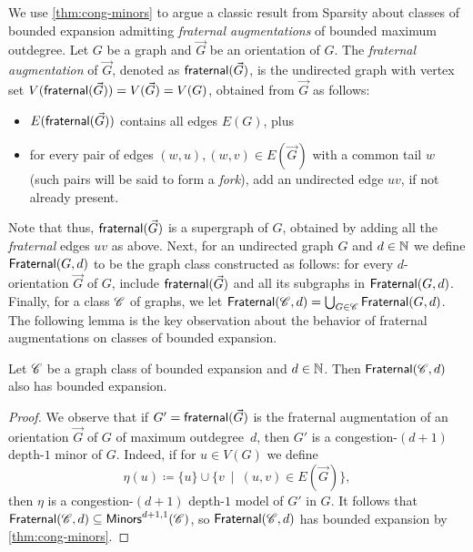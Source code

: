 We use \cref{thm:cong-minors} to argue a classic result from Sparsity %
about classes of bounded expansion admitting \emph{fraternal augmentations} of bounded maximum outdegree. Let $G$ be a graph and $\vec G$ be an orientation of $G$. The \emph{fraternal augmentation} of $\vec G$, denoted as $\mathsf{fraternal}(\vec G)$, is the undirected graph with vertex set $V(\mathsf{fraternal}(\vec G))=V(\vec G)=V(G)$, obtained from $\vec G$ as follows:
\begin{itemize}
    \item $E(\mathsf{fraternal}(\vec G))$ contains all edges $E(G)$, plus
	\item for every pair of edges $(w, u),(w, v)\in E(\vec G)$ with a common tail $w$ (such pairs will be said to form a \emph{fork}), add an undirected edge $uv$, if not already present.%
\end{itemize}
Note that thus, $\mathsf{fraternal}(\vec G)$ is a supergraph of $G$, obtained by adding all the \emph{fraternal} edges $uv$ as above.
Next, for an undirected graph $G$ and $d \in \mathbb{N}$ we define $\mathsf{Fraternal}(G,d)$
to be the graph class constructed as follows: for every $d$-orientation $\vec G$ of $G$, include $\mathsf{fraternal}(\vec G)$ and all its subgraphs in $\mathsf{Fraternal}(G,d)$.
Finally, for a class $\mathscr C$ of graphs, we let $\mathsf{Fraternal}(\mathscr C,d)=\bigcup_{G \in \mathscr C} \mathsf{Fraternal}(G,d)$.
The following lemma is the key observation about the behavior of fraternal augmentations on classes of bounded expansion.
\begin{lemma}\label{lem:fraternal}
	Let $\mathscr C$ be a graph class of bounded expansion and $d\in \mathbb{N}$. Then $\mathsf{Fraternal}(\mathscr C,d)$ also has bounded expansion.
\end{lemma}
\begin{proof}
	We observe that if $G'=\mathsf{fraternal}(\vec G)$ is the fraternal augmentation of an orientation $\vec G$ of $G$ of maximum outdegree~$d$, then $G'$ is a congestion-$(d+1)$ depth-$1$ minor of $G$. Indeed, if for $u\in V(G)$ we define
	\[\eta(u)\coloneqq \{u\}\cup \{v~\mid~(u, v)\in E(\vec G)\},\]
	then $\eta$ is a congestion-$(d+1)$ depth-$1$ model of $G'$ in $G$. It follows that $\mathsf{Fraternal}(\mathscr C,d)\subseteq \mathsf{Minors}^{d+1,1}(\mathscr C)$, so $\mathsf{Fraternal}(\mathscr C,d)$ has bounded expansion by \cref{thm:cong-minors}.
\end{proof}

